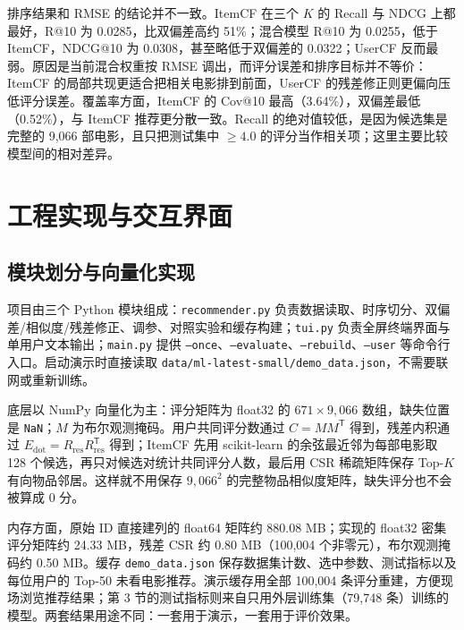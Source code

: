 \documentclass[10pt,a4paper]{article}
\newcommand{\code}[1]{\texttt{#1}}
\begin{document}
排序结果和 RMSE 的结论并不一致。ItemCF 在三个 $K$ 的 Recall 与 NDCG 上都最好，R@10 为 0.0285，比双偏差高约 51\%；混合模型 R@10 为 0.0255，低于 ItemCF，NDCG@10 为 0.0308，甚至略低于双偏差的 0.0322；UserCF 反而最弱。原因是当前混合权重按 RMSE 调出，而评分误差和排序目标并不等价：ItemCF 的局部共现更适合把相关电影排到前面，UserCF 的残差修正则更偏向压低评分误差。覆盖率方面，ItemCF 的 Cov@10 最高（3.64\%），双偏差最低（0.52\%），与 ItemCF 推荐更分散一致。Recall 的绝对值较低，是因为候选集是完整的 9,066 部电影，且只把测试集中 $\ge 4.0$ 的评分当作相关项；这里主要比较模型间的相对差异。

\section{工程实现与交互界面}
\subsection{模块划分与向量化实现}
项目由三个 Python 模块组成：\code{recommender.py} 负责数据读取、时序切分、双偏差/相似度/残差修正、调参、对照实验和缓存构建；\code{tui.py} 负责全屏终端界面与单用户文本输出；\code{main.py} 提供 \code{--once}、\code{--evaluate}、\code{--rebuild}、\code{--user} 等命令行入口。启动演示时直接读取 \code{data/ml-latest-small/demo\_data.json}，不需要联网或重新训练。

底层以 NumPy 向量化为主：评分矩阵为 float32 的 $671\times9{,}066$ 数组，缺失位置是 \code{NaN}；$M$ 为布尔观测掩码。用户共同评分数通过 $C=MM^{\mathsf T}$ 得到，残差内积通过 $E_{\mathrm{dot}}=R_{\mathrm{res}}R_{\mathrm{res}}^{\mathsf T}$ 得到；ItemCF 先用 scikit-learn 的余弦最近邻为每部电影取 128 个候选，再只对候选对统计共同评分人数，最后用 CSR 稀疏矩阵保存 Top-$K$ 有向物品邻居。这样就不用保存 $9{,}066^2$ 的完整物品相似度矩阵，缺失评分也不会被算成 0 分。

内存方面，原始 ID 直接建列的 float64 矩阵约 880.08 MB；实现的 float32 密集评分矩阵约 24.33 MB，残差 CSR 约 0.80 MB（100,004 个非零元），布尔观测掩码约 0.50 MB。缓存 \code{demo\_data.json} 保存数据集计数、选中参数、测试指标以及每位用户的 Top-50 未看电影推荐。演示缓存用全部 100,004 条评分重建，方便现场浏览推荐结果；第 3 节的测试指标则来自只用外层训练集（79,748 条）训练的模型。两套结果用途不同：一套用于演示，一套用于评价效果。
\end{document}
